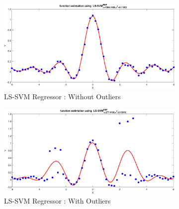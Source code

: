\begin{figure}[!ht] 
	\begin{subfigure}{.35\textwidth}
		\centering
		\captionsetup{width=0.8\linewidth}
		\includegraphics[height=.65\linewidth, width=0.9\linewidth]{Exercise2/Report/robust_withoutOutliers}
		\caption{LS-SVM Regressor : Without Outliers}
		\label{fig:rob_nooutliers}
	\end{subfigure}%
	\begin{subfigure}{.35\textwidth}
		\centering
		\captionsetup{width=0.8\linewidth}
		\includegraphics[height=.65\linewidth, width=0.9\linewidth]{Exercise2/Report/robust_withOutliers}
		\caption{LS-SVM Regressor : With Outliers}
		\label{fig:rob_outliers}
	\end{subfigure}%
	\begin{subfigure}{.35\textwidth}
		\centering
		\captionsetup{width=0.8\linewidth}

\end{subfigure}
\end{figure}
